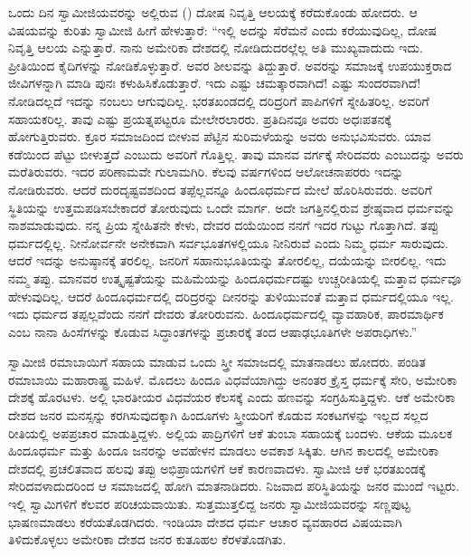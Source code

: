 ಒಂದು ದಿನ ಸ್ವಾಮೀಜಿಯವರನ್ನು ಅಲ್ಲಿರುವ () ದೋಷ ನಿವೃತ್ತಿ ಆಲಯಕ್ಕೆ ಕರೆದುಕೊಂಡು ಹೋದರು. ಆ ವಿಷಯವನ್ನು ಕುರಿತು ಸ್ವಾಮೀಜಿ ಹೀಗೆ ಹೇಳುತ್ತಾರೆ: “ಇಲ್ಲಿ ಅದನ್ನು ಸೆರೆಮನೆ ಎಂದು ಕರೆಯುವುದಿಲ್ಲ, ದೋಷ ನಿವೃತ್ತಿ ಆಲಯ ಎನ್ನುತ್ತಾರೆ. ನಾನು ಅಮೇರಿಕಾ ದೇಶದಲ್ಲಿ ನೋಡಿದುದರಲ್ಲೆಲ್ಲ ಅತಿ ಮುಖ್ಯವಾದುದು ಇದು. ಪ್ರೀತಿಯಿಂದ ಕೈದಿಗಳನ್ನು ನೋಡಿಕೊಳ್ಳುತ್ತಾರೆ. ಅವರ ಶೀಲವನ್ನು ತಿದ್ದುತ್ತಾರೆ. ಅವರನ್ನು ಸಮಾಜಕ್ಕೆ ಉಪಯುಕ್ತರಾದ ಜೀವಿಗಳನ್ನಾಗಿ ಮಾಡಿ ಪುನಃ ಕಳುಹಿಸಿಕೊಡುತ್ತಾರೆ. ಇದು ಎಷ್ಟು ಚಮತ್ಕಾರವಾಗಿದೆ! ಎಷ್ಟು ಸುಂದರವಾಗಿದೆ! ನೋಡಿದಲ್ಲದೆ ಇದನ್ನು ನಂಬಲು ಆಗುವುದಿಲ್ಲ. ಭರತಖಂಡದಲ್ಲಿ ದರಿದ್ರರಿಗೆ ಪಾಪಿಗಳಿಗೆ ಸ್ನೇಹಿತರಿಲ್ಲ. ಅವರಿಗೆ ಸಹಾಯಕರಿಲ್ಲ. ತಾವು ಎಷ್ಟು ಪ್ರಯತ್ನಪಟ್ಟರೂ ಮೇಲೇರಲಾರರು. ಪ್ರತಿದಿನವೂ ಅವರು ಅಧಃಪತನಕ್ಕೆ ಹೋಗುತ್ತಿರುವರು. ಕ್ರೂರ ಸಮಾಜದಿಂದ ಬೀಳುವ ಪೆಟ್ಟಿನ ಸುರಿಮಳೆಯನ್ನು ಅವರು ಅನುಭವಿಸುವರು. ಯಾವ ಕಡೆಯಿಂದ ಪೆಟ್ಟು ಬೀಳುತ್ತದೆ ಎಂಬುದು ಅವರಿಗೆ ಗೊತ್ತಿಲ್ಲ. ತಾವು ಮಾನವ ವರ್ಗಕ್ಕೆ ಸೇರಿದವರು ಎಂಬುದನ್ನು ಅವರು ಮರೆತಿರುವರು. ಇದರ ಪರಿಣಾಮವೇ ಗುಲಾಮಗಿರಿ. ಕೆಲವು ವರ್ಷಗಳಿಂದ ಆಲೋಚನಾಪರರು ಇದನ್ನು ನೋಡಿರುವರು. ಆದರೆ ದುರದೃಷ್ಟವಶದಿಂದ ತಪ್ಪೆಲ್ಲವನ್ನೂ ಹಿಂದೂಧರ್ಮದ ಮೇಲೆ ಹೊರಿಸಿರುವರು. ಅವರಿಗೆ ಸ್ಥಿತಿಯನ್ನು ಉತ್ತಮಪಡಿಸಬೇಕಾದರೆ ತೋರುವುದು ಒಂದೇ ಮಾರ್ಗ. ಅದೇ ಜಗತ್ತಿನಲ್ಲಿರುವ ಶ್ರೇಷ್ಠವಾದ ಧರ್ಮವನ್ನು ನಾಶಮಾಡುವುದು. ನನ್ನ ಪ್ರಿಯ ಸ್ನೇಹಿತನೇ ಕೇಳು, ದೇವರ ದಯೆಯಿಂದ ನನಗೆ ಇದರ ಗುಟ್ಟು ಗೊತ್ತಾಗಿದೆ. ತಪ್ಪು ಧರ್ಮದಲ್ಲಿಲ್ಲ. ನೀನೋರ್ವನೇ ಅನೇಕವಾಗಿ ಸರ್ವಭೂತಗಳಲ್ಲಿಯೂ ನೀನಿರುವೆ ಎಂದು ನಿಮ್ಮ ಧರ್ಮ ಸಾರುವುದು. ಆದರೆ ಇದನ್ನು ಅನುಷ್ಠಾನಕ್ಕೆ ತರಲಿಲ್ಲ. ಜನರಿಗೆ ಸಹಾನುಭೂತಿಯನ್ನು ತೋರಲಿಲ್ಲ, ದಯೆಯನ್ನು ಬೀರಲಿಲ್ಲ. ಇದು ನಮ್ಮ ತಪ್ಪು. ಮಾನವರ ಉತ್ಕೃಷ್ಟತೆಯನ್ನು ಮಹಿಮೆಯನ್ನು ಹಿಂದೂಧರ್ಮದಷ್ಟು ಉಚ್ಚರೀತಿಯಲ್ಲಿ ಮತ್ತಾವ ಧರ್ಮವೂ ಹೇಳುವುದಿಲ್ಲ. ಆದರೆ ಹಿಂದೂಧರ್ಮದಲ್ಲಿ ದರಿದ್ರರನ್ನು ದೀನರನ್ನು ತುಳಿಯುವಂತೆ ಮತ್ತಾವ ಧರ್ಮದಲ್ಲಿಯೂ ಇಲ್ಲ. ಇದು ಧರ್ಮದ ತಪ್ಪಲ್ಲವೆಂದು ನನಗೆ ದೇವರು ತೋರಿರುವನು. ಹಿಂದೂಧರ್ಮದಲ್ಲಿ ವ್ಯಾವಹಾರಿಕ, ಪಾರಮಾರ್ಥಿಕ ಎಂಬ ನಾನಾ ಹಿಂಸೆಗಳನ್ನು ಕೊಡುವ ಸಿದ್ಧಾಂತಗಳನ್ನು ಪ್ರಚಾರಕ್ಕೆ ತಂದ ಆಷಾಢಭೂತಿಗಳೇ ಅಪರಾಧಿಗಳು.” 

 ಸ್ವಾಮೀಜಿ ರಮಾಬಾಯಿಗೆ ಸಹಾಯ ಮಾಡುವ ಒಂದು ಸ್ತ್ರೀ ಸಮಾಜದಲ್ಲಿ ಮಾತನಾಡಲು ಹೋದರು. ಪಂಡಿತ ರಮಾಬಾಯಿ ಮಹಾರಾಷ್ಟ್ರ ಮಹಿಳೆ. ಮೊದಲು ಹಿಂದೂ ವಿಧವೆಯಾಗಿದ್ದು ಅನಂತರ ಕ್ರೈಸ್ತ ಧರ್ಮಕ್ಕೆ ಸೇರಿ, ಅಮೇರಿಕಾ ದೇಶಕ್ಕೆ ಹೊರಟಳು. ಅಲ್ಲಿ ಭಾರತೀಯರ ವಿಧವೆಯರ ಕೆಲಸಕ್ಕೆ ಎಂದು ಹಣವನ್ನು ಸಂಗ್ರಹಿಸು\-ತ್ತಿದ್ದಳು. ಆಕೆ ಅಮೇರಿಕಾ ದೇಶದ ಜನರ ಮನಸ್ಸನ್ನು ಕರಗಿಸುವುದಕ್ಕಾಗಿ ಹಿಂದೂಗಳು ಸ್ತ್ರೀಯರಿಗೆ ಕೊಡುವ ಸಂಕಟಗಳನ್ನು ಇಲ್ಲದ ಸಲ್ಲದ ರೀತಿಯಲ್ಲಿ ಅಪಪ್ರಚಾರ ಮಾಡುತ್ತಿದ್ದಳು. ಅಲ್ಲಿಯ ಪಾದ್ರಿಗಳಿಗೆ ಆಕೆ ತುಂಬಾ ಸಹಾಯಕ್ಕೆ ಬಂದಳು. ಆಕೆಯ ಮೂಲಕ ಹಿಂದೂಧರ್ಮ ಮತ್ತು ಹಿಂದೂ ಜನರನ್ನು ಅವಹೇಳನ ಮಾಡಲು ಅವಕಾಶ ಸಿಕ್ಕಿತು. ಆಗಿನ ಕಾಲದಲ್ಲಿ ಅಮೇರಿಕಾ ದೇಶದಲ್ಲಿ ಪ್ರಚಲಿತವಾದ ಹಲವು ತಪ್ಪು ಅಭಿಪ್ರಾಯಗಳಿಗೆ ಆಕೆ ಕಾರಣವಾದಳು. ಸ್ವಾಮೀಜಿ ಆಕೆ ಭರತಖಂಡಕ್ಕೆ ಸೇರಿದವಳಾದುದರಿಂದ ಆ ಸಮಾಜದಲ್ಲಿ ಹೋಗಿ ಮಾತನಾಡಿದರು. ನಿಜವಾದ ಪರಿಸ್ಥಿತಿಯನ್ನು ಜನರ ಮುಂದೆ ಇಟ್ಟರು. ಇಲ್ಲಿ ಸ್ವಾಮಿಗಳಿಗೆ ಕೆಲವರ ಪರಿಚಯವಾಯಿತು. ಸುತ್ತಮುತ್ತಲಿದ್ದ ಜನರು ಸ್ವಾಮೀಜಿಯವರನ್ನು ಸಣ್ಣಪುಟ್ಟ ಭಾಷಣಮಾಡಲು ಕರೆಯತೊಡಗಿದರು. ಇಂಡಿಯಾ ದೇಶದ ಧರ್ಮ ಆಚಾರ ವ್ಯವಹಾರದ ವಿಷಯವಾಗಿ ತಿಳಿದುಕೊಳ್ಳಲು ಅಮೇರಿಕಾ ದೇಶದ ಜನರ ಕುತೂಹಲ ಕೆರಳತೊಡಗಿತು. 

